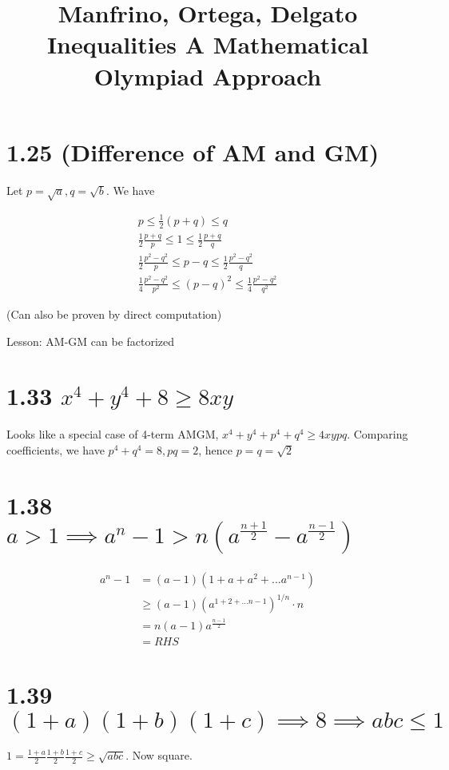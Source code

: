 \documentclass{article}
\title{Manfrino, Ortega, Delgato Inequalities A Mathematical Olympiad Approach}
\date{}
\def\f12{\frac{1}{2}}
\begin{document}
\maketitle

\section*{1.25 (Difference of AM and GM)}

Let $p = \sqrt{a}, q = \sqrt{b}$. We have

\begin{align*}
p \le \f12(p+q) \le q \\
\f12 \frac{p+q}{p} \le 1 \le \f12 \frac{p+q}{q} \\
\f12 \frac{p^2 - q^2}{p} \le p-q \le \f12 \frac{p^2 - q^2}{q} \\
\frac{1}{4} \frac{p^2 - q^2}{p^2} \le (p-q)^2 \le \frac{1}{4} \frac{p^2 - q^2}{q^2}
\end{align*}

(Can also be proven by direct computation)

Lesson: AM-GM can be factorized

\section*{1.33 $x^4 + y^4 + 8 \ge 8xy$}

Looks like a special case of 4-term AMGM, $x^4 + y^4 + p^4 + q^4 \ge 4xypq$. Comparing coefficients, we have $p^4 + q^4 = 8, pq = 2$, hence $p = q = \sqrt 2$

\section*{1.38 $a > 1 \implies a^n-1 > n (a^{\frac{n+1}{2}} - a^{\frac{n-1}{2}})$}

\begin{align*}
a^n - 1 &= (a-1) (1 + a + a^2 + \ldots a^{n-1}) \\
&\ge (a-1) (a ^ {1 + 2 + \ldots n-1})^{1/n} \cdot n \\
&= n (a-1) a^\frac{n-1}{2} \\
&= RHS
\end{align*}

\section*{1.39 $(1+a)(1+b)(1+c) \implies 8 \implies abc \le 1$}

$ 1 = \frac{1+a}{2} \frac{1+b}{2} \frac{1+c}{2} \ge \sqrt{abc}$. Now square.
\end{document}
